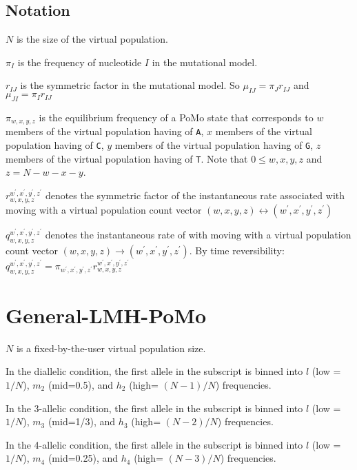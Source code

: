 \documentclass{llncs}
\begin{document}
\subsection*{Notation}
\begin{compactenum}
    \item $N$ is the size of the virtual population.
    \item $\pi_I$ is the frequency of nucleotide $I$ in the mutational model.
    \item $r_{IJ}$ is the symmetric factor in the mutational model.
    So $\mu_{IJ} = \pi_J r_{IJ}$ and $\mu_{JI} = \pi_I r_{IJ}$
    \item $\pi_{w,x,y,z}$ is the equilibrium frequency of a PoMo state that corresponds to
        $w$ members of the virtual population having of \texttt{A}, 
        $x$ members of the virtual population having of \texttt{C},
        $y$ members of the virtual population having of \texttt{G}, 
        $z$ members of the virtual population having of \texttt{T}. Note that $0\leq w, x, y, z$ and
        $z = N- w- x-y$.
    \item $r_{w,x,y,z}^{w^\prime,x^\prime,y^\prime,z^\prime}$ denotes
    the symmetric factor of the instantaneous rate associated with moving with a virtual population count 
    vector $(w,x,y,z)\leftrightarrow\left({w^\prime,x^\prime,y^\prime,z^\prime}\right)$
    \item $q_{w,x,y,z}^{w^\prime, x^\prime, y^\prime, z^\prime}$ denotes the
    instantaneous rate of with moving with a virtual population count 
    vector $(w,x,y,z)\rightarrow\left({w^\prime,x^\prime,y^\prime,z^\prime}\right)$.
    By time reversibility:
    $q_{w,x,y,z}^{w^\prime, x^\prime, y^\prime, z^\prime} = \pi_{w^\prime, x^\prime, y^\prime, z^\prime} r_{w,x,y,z}^{w^\prime,x^\prime,y^\prime,z^\prime}$
\end{compactenum}

\section*{General-LMH-PoMo}
\begin{compactenum}
    \item $N$ is a fixed-by-the-user virtual population size.
    \item In the diallelic condition, the first allele in the subscript is
    binned into $l$ (low = $1/N$), $m_2$ (mid=0.5), and $h_2$ (high= $(N-1)/N$) frequencies.
    \item In the 3-allelic condition, the first allele in the subscript is
    binned into $l$ (low = $1/N$), $m_3$ (mid=1/3), and $h_3$ (high= $(N-2)/N$) frequencies.
    \item In the 4-allelic condition, the first allele in the subscript is
    binned into $l$ (low = $1/N$), $m_4$ (mid=0.25), and $h_4$ (high= $(N-3)/N$) frequencies.
\end{compactenum}
\end{document}
